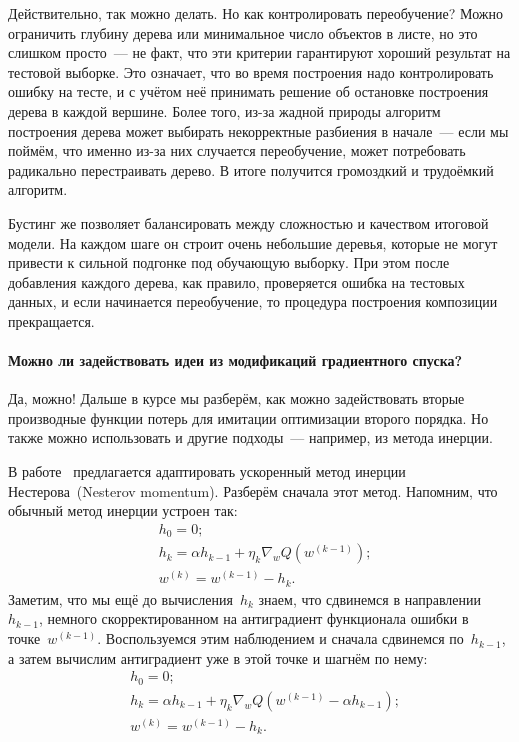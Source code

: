 \documentclass[12pt,fleqn]{article}
\begin{document}
Действительно, так можно делать. Но как контролировать переобучение?
Можно ограничить глубину дерева или минимальное число объектов в листе, но это слишком просто~---
не факт, что эти критерии гарантируют хороший результат на тестовой выборке.
Это означает, что во время построения надо контролировать ошибку на тесте,
и с учётом неё принимать решение об остановке построения дерева в каждой вершине.
Более того, из-за жадной природы алгоритм построения дерева может выбирать некорректные
разбиения в начале~--- если мы поймём, что именно из-за них случается переобучение, может
потребовать радикально перестраивать дерево.
В итоге получится громоздкий и трудоёмкий алгоритм.

Бустинг же позволяет балансировать между сложностью и качеством итоговой модели.
На каждом шаге он строит очень небольшие деревья, которые не могут привести к сильной подгонке под
обучающую выборку.
При этом после добавления каждого дерева, как правило, проверяется ошибка на тестовых данных,
и если начинается переобучение, то процедура построения композиции прекращается.

\paragraph{Можно ли задействовать идеи из модификаций градиентного спуска?}
Да, можно!
Дальше в курсе мы разберём, как можно задействовать вторые производные
функции потерь для имитации оптимизации второго порядка.
Но также можно использовать и другие подходы~--- например, из метода инерции.

В работе~\cite{lu20accelerating} предлагается адаптировать ускоренный метод инерции Нестерова~(Nesterov momentum).
Разберём сначала этот метод.
Напомним, что обычный метод инерции устроен так:
\begin{align*}
    &h_0 = 0;\\
    &h_k = \alpha h_{k - 1} + \eta_k \nabla_w Q(w^{(k-1)});\\
    &w^{(k)} = w^{(k-1)} - h_k.
\end{align*}
Заметим, что мы ещё до вычисления~$h_k$ знаем, что сдвинемся в направлении~$h_{k - 1}$,
немного скорректированном на антиградиент функционала ошибки в точке~$w^{(k-1)}$.
Воспользуемся этим наблюдением и сначала сдвинемся по~$h_{k - 1}$,
а затем вычислим антиградиент уже в этой точке и шагнём по нему:
\begin{align*}
    &h_0 = 0;\\
    &h_k = \alpha h_{k - 1} + \eta_k \nabla_w Q(w^{(k-1)} - \alpha h_{k - 1});\\
    &w^{(k)} = w^{(k-1)} - h_k.
\end{align*}
\end{document}

